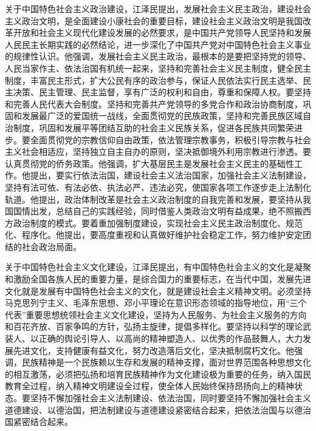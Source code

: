 \documentclass[UTF8, 11pt, oneside]{ctexart}
\begin{document}
关于中国特色社会主义政治建设，江泽民提出，发展社会主义民主政治，建设社会主义政治文明，是全面建设小康社会的重要目标，建设社会主义政治文明是我国改革开放和社会主义现代化建设发展的必然要求，是中国共产党领导人民坚持和发展人民民主长期实践的必然结论，进一步深化了中国共产党对中国特色社会主义事业的规律性认识。他强调，发展社会主义民主政治，最根本的是要把坚持党的领导、人民当家作主、依法治国有机统一起来，坚持和完善社会主义民主制度，健全民主制度，丰富民主形式，扩大公民有序的政治参与，保证人民依法实行民主选举、民主决策、民主管理、民主监督，享有广泛的权利和自由，尊重和保障人权。要坚持和完善人民代表大会制度。坚持和完善共产党领导的多党合作和政治协商制度，巩固和发展最广泛的爱国统一战线，全面贯彻党的民族政策，坚持和完善民族区域自治制度，巩固和发展平等团结互助的社会主义民族关系，促进各民族共同繁荣进步。要全面贯彻党的宗教信仰自由政策，依法管理宗教事务，积极引导宗教与社会主义社会相适应，坚持独立自主自办的原则，坚决抵御境外利用宗教进行渗透。要认真贯彻党的侨务政策。他强调，扩大基层民主是发展社会主义民主的基础性工作。他提出，要实行依法治国，建设社会主义法治国家，加强社会主义法制建设，坚持有法可依、有法必依、执法必严、违法必究，使国家各项工作逐步走上法制化轨道。他提出，政治体制改革是社会主义政治制度的自我完善和发展，要坚持从我国国情出发，总结自己的实践经验，同时借鉴人类政治文明有益成果，绝不照搬西方政治制度的模式。要着重加强制度建设，实现社会主义民主政治制度化、规范化、程序化。他提出，要高度重视和认真做好维护社会稳定工作，努力维护安定团结的社会政治局面。

关于中国特色社会主义文化建设，江泽民提出，有中国特色社会主义的文化是凝聚和激励全国各族人民的重要力量，是综合国力的重要标志，在当代中国，发展先进文化就是发展有中国特色社会主义的文化，就是建设社会主义精神文明。必须坚持马克思列宁主义、毛泽东思想、邓小平理论在意识形态领域的指导地位，用“三个代表”重要思想统领社会主义文化建设，坚持为人民服务、为社会主义服务的方向和百花齐放、百家争鸣的方针，弘扬主旋律，提倡多样化。要坚持以科学的理论武装人、以正确的舆论引导人、以高尚的精神塑造人、以优秀的作品鼓舞人，大力发展先进文化，支持健康有益文化，努力改造落后文化，坚决抵制腐朽文化。他强调，民族精神是一个民族赖以生存和发展的精神支撑，面对世界范围各种思想文化的相互激荡，必须把弘扬和培育民族精神作为文化建设极为重要的任务，纳入国民教育全过程，纳入精神文明建设全过程，使全体人民始终保持昂扬向上的精神状态。要坚持不懈加强社会主义法制建设、依法治国，同时要坚持不懈加强社会主义道德建设、以德治国，把法制建设与道德建设紧密结合起来，把依法治国与以德治国紧密结合起来。
\end{document}
